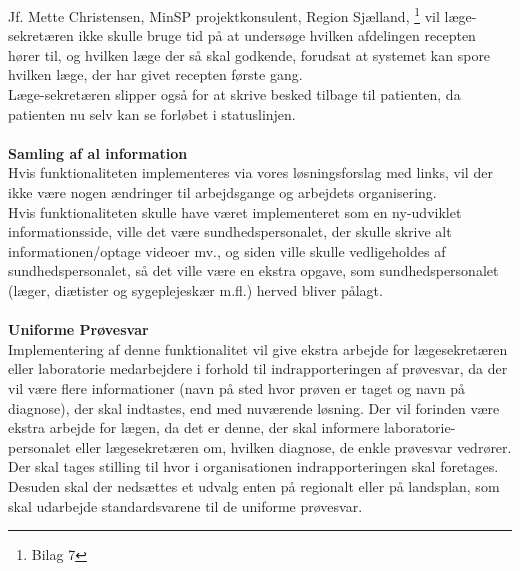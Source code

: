 Jf. Mette Christensen, MinSP projektkonsulent, Region Sjælland, \footnote{Bilag 7} vil læge-sekretæren ikke skulle bruge tid på at undersøge hvilken afdelingen recepten hører til, og hvilken læge der så skal godkende, forudsat at systemet kan spore hvilken læge, der har givet recepten første gang.\\
Læge-sekretæren slipper også for at skrive besked tilbage til patienten, da patienten nu selv kan se forløbet i statuslinjen.
\\\\
\textbf{Samling af al information} \\
Hvis funktionaliteten implementeres via vores løsningsforslag med links, vil der ikke være nogen ændringer til arbejdsgange og arbejdets organisering. \\
Hvis funktionaliteten skulle have været implementeret som en ny-udviklet informationsside, ville det være sundhedspersonalet, der skulle skrive alt informationen/optage videoer mv., og siden ville skulle vedligeholdes af sundhedspersonalet, så det ville være en ekstra opgave, som sundhedspersonalet (læger, diætister og sygeplejeskær m.fl.) herved bliver pålagt. 
\\\\
\textbf{Uniforme Prøvesvar} \\
Implementering af denne funktionalitet vil give ekstra arbejde for lægesekretæren eller laboratorie medarbejdere i forhold til indrapporteringen af prøvesvar, da der vil være flere informationer (navn på sted hvor prøven er taget og navn på diagnose), der skal indtastes, end med nuværende løsning. Der vil forinden være ekstra arbejde for lægen, da det er denne, der skal informere laboratorie-personalet eller lægesekretæren om, hvilken diagnose, de enkle prøvesvar vedrører.\\
Der skal tages stilling til hvor i organisationen indrapporteringen skal foretages. Desuden skal der nedsættes et udvalg enten på regionalt eller på landsplan, som skal udarbejde standardsvarene til de uniforme prøvesvar.
